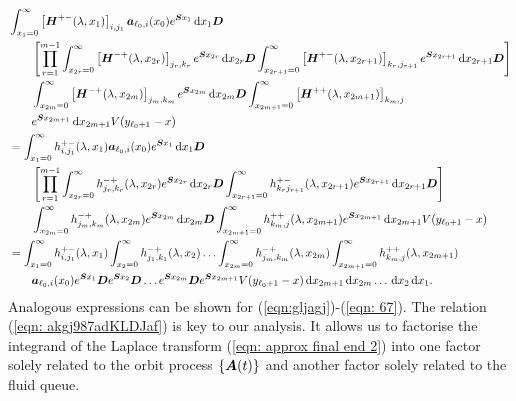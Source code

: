 \begin{align}
	&\int_{x_1=0}^\infty \left[\bs H^{+-}(\lambda,x_1)\right]_{i,j_{1}}\bs   a_{\ell_0,i}(x_0)e^{\bs{S}x_1}\wrt x_1 \bs{D}\nonumber%
	\\&\qquad\nonumber \left[\prod_{r=1}^{m-1} \int_{x_{2r}=0}^\infty \left[\bs H^{-+}(\lambda,x_{2r})\right]_{j_{r},k_r}e^{\bs{S}x_{2r}}\wrt x_{2r} \bs{D}
	 \int_{x_{2r+1}=0}^\infty \left[\bs H^{+-}(\lambda,x_{2r+1})\right]_{k_r,j_{r+1}} e^{\bs{S}x_{2r+1}} \wrt x_{2r+1} \bs{D}\right]
	\\&\qquad \int_{x_{2m}=0}^\infty \left[\bs H^{-+}(\lambda,x_{2m})\right]_{j_{m},k_m} e^{\bs{S}x_{2m}} \wrt x_{2m} \bs{D}
	\int_{x_{2m+1}=0}^\infty \left[\bs H^{++}(\lambda,x_{2m+1})\right]_{k_m,j} \nonumber
	\\&\qquad e^{\bs{S}x_{2m+1}} \wrt x_{2m+1}V(y_{\ell_0+1}-x)  \nonumber
	\\
	&=\int_{x_1=0}^\infty h^{+-}_{i,j_{1}}(\lambda,x_1)\bs   a_{\ell_0,i}(x_0)e^{\bs{S}x_1}\wrt x_1 \bs{D}\nonumber
	\\&\nonumber \qquad \left[\prod_{r=1}^{m-1} \int_{x_{2r}=0}^\infty h^{-+}_{j_r,k_r}(\lambda,x_{2r}) e^{\bs{S}x_{2r}}\wrt x_{2r}\bs D \int_{x_{2r+1}=0}^\infty h^{+-}_{k_rj_{r+1}}(\lambda,x_{2r+1}) e^{\bs{S}x_{2r+1}} \wrt x_{2r+1}\bs D\right]
	\\&
	\qquad \int_{x_{2m}=0}^\infty h^{-+}_{j_{m},k_m}(\lambda, x_{2m}) e^{\bs{S}x_{2m}} \wrt x_{2m} \bs{D}\int_{x_{2m+1}=0}^\infty h^{++}_{k_m,j}(\lambda,x_{2m+1}) e^{\bs{S}x_{2m+1}}\wrt x_{2m+1}V(y_{\ell_0+1}-x) \nonumber
	\\&=\int_{x_1=0}^\infty h^{+-}_{i,j_{1}}(\lambda,x_1)
	\int_{x_2=0}^\infty h^{-+}_{j_1,k_1}(\lambda,x_2)
	\hdots \int_{x_{2m}=0}^\infty h^{-+}_{j_{m},k_m}(\lambda, x_{2m})  \int_{x_{2m+1}=0}^\infty h^{++}_{k_m,j}(\lambda,x_{2m+1})\nonumber
	\\&
	 \qquad \bs   a_{\ell_0,i}(x_0)e^{\bs{S}x_1} \bs{D} e^{\bs{S}x_2} \bs{D}\dots e^{\bs{S}x_{2m}}  \bs{D}e^{\bs{S}x_{2m+1}} V(y_{\ell_0+1}-x)  \wrt x_{2m+1} \wrt x_{2m}\dots\wrt x_2 \wrt x_1. \label{eqn: approx final end 2}
\end{align}
Analogous expressions can be shown for (\ref{eqn:gljagj})-(\ref{eqn: 67}). The relation (\ref{eqn: akgj987adKLDJaf}) is key to our analysis. It allows us to factorise the integrand of the Laplace transform (\ref{eqn: approx final end 2}) into one factor solely related to the orbit process \(\{\boldsymbol A(t)\}\) and another factor solely related to the fluid queue. 

